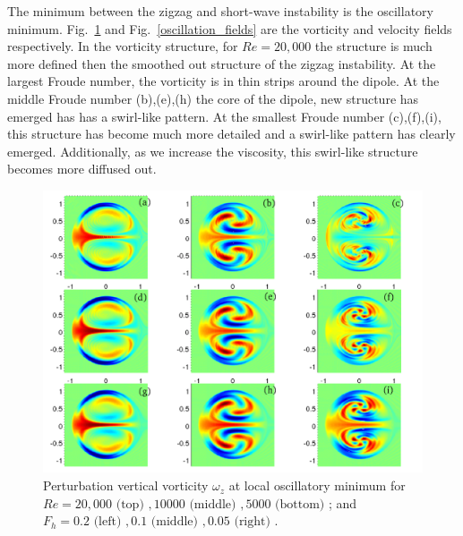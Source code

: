 The minimum between the zigzag and short-wave instability is the oscillatory minimum. Fig.~\ref{oscillation_vorticity} and Fig.~\ref{oscillation_fields} are the vorticity and velocity fields respectively. In the vorticity structure, for $Re=20{,}000$ the structure is much more defined then the smoothed out structure of the zigzag instability. At the largest Froude number, the vorticity is in thin strips around the dipole. At the middle Froude number (b),(e),(h) the core of the dipole, new structure has emerged has has a swirl-like pattern. At the smallest Froude number (c),(f),(i), this structure has become much more detailed and a swirl-like pattern has clearly emerged. Additionally, as we increase the viscosity, this swirl-like structure becomes more diffused out. 
\begin{figure}
\begin{center}
\includegraphics[width=\textwidth]{vorticity_oscillation}
\caption{Perturbation vertical vorticity $\omega_{z}$ at local oscillatory minimum for $Re=20{,}000\text{ (top) }, 10000 \text{ (middle) }, 5000 \text{ (bottom) }$; and $F_{h}=0.2 \text{ (left) }, 0.1 \text{ (middle) }, 0.05 \text{ (right) }$.}
\label{oscillation_vorticity}
\end{center}
\end{figure} 
